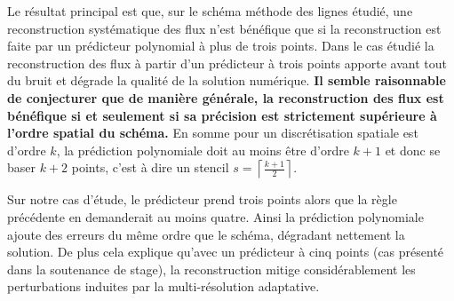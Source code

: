 Le résultat principal est que, sur le schéma méthode des lignes étudié, une reconstruction systématique des flux n'est bénéfique que si la reconstruction est faite par un
prédicteur polynomial à plus de trois points. Dans le cas étudié la reconstruction des flux à partir d'un prédicteur à trois points apporte avant tout du bruit et dégrade la qualité de la solution numérique.
\textbf{
    Il semble raisonnable de conjecturer que de manière générale,
    la reconstruction des flux est bénéfique si et seulement si 
    sa précision est strictement supérieure à l'ordre spatial du schéma.}
En somme pour un discrétisation spatiale est d'ordre $k$, la prédiction polynomiale doit au moins être d'ordre $k+1$ et donc se baser $k+2$ points, 
c'est à dire un stencil $s = \left\lceil{\frac{k+1}{2}}\right\rceil$.\par 
Sur notre cas d'étude, le prédicteur prend trois points alors que la règle précédente en demanderait au moins quatre.
Ainsi la prédiction polynomiale ajoute des erreurs du même ordre que le schéma, dégradant nettement la solution.
De plus cela explique qu'avec un prédicteur à cinq points (cas présenté dans la soutenance de stage),
la reconstruction mitige considérablement les perturbations induites par la multi-résolution adaptative.